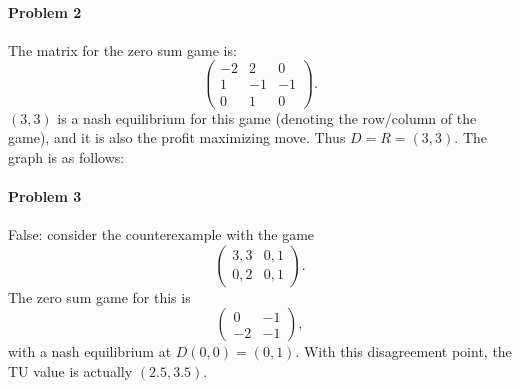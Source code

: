 \documentclass[12pt]{article}
\begin{document}
\paragraph{Problem 2}
The matrix for the zero sum game is:
\begin{displaymath}
  \begin{pmatrix}
    -2 & 2 & 0\\
    1 & -1 & -1\\
    0 & 1 & 0
  \end{pmatrix}.
\end{displaymath}
$(3,3)$ is a nash equilibrium for this game (denoting the row/column of the game),
and it is also the profit maximizing move. Thus $D = R = (3,3)$. The graph is
as follows:
\vspace{100pt}

\paragraph{Problem 3}
False: consider the counterexample with the game
\begin{displaymath}
  \begin{pmatrix}
    3,3 & 0,1\\
    0,2 & 0,1
  \end{pmatrix}.
\end{displaymath}
The zero sum game for this is
\begin{displaymath}
  \begin{pmatrix}
    0 & -1\\
    -2& -1
  \end{pmatrix},
\end{displaymath}
with a nash equilibrium at $D(0,0) = (0,1)$. With this disagreement point,
the TU value is actually $(2.5,3.5)$.
\end{document}
